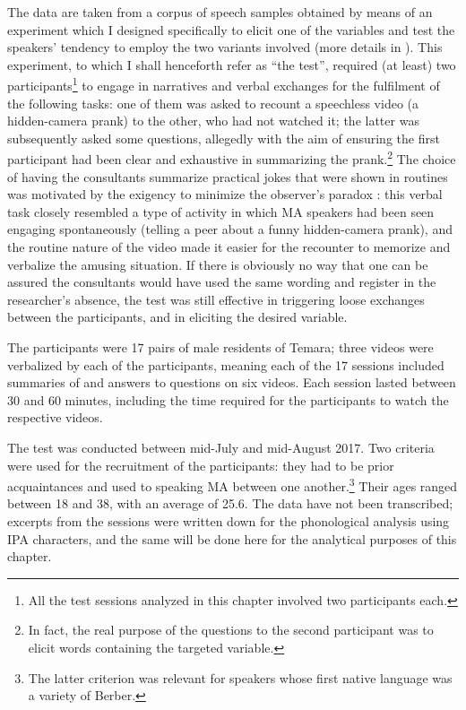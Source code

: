 \documentclass[output=paper]{langscibook}
\begin{document}
The data are taken from a corpus of speech samples obtained by means of an experiment which I designed specifically to elicit one of the variables and test the speakers’ tendency to employ the two variants involved (more details in \citealt{falchetta_social_2019}). This experiment, to which I shall henceforth refer as ``the test'', required (at least) two participants\footnote{All the test sessions analyzed in this chapter involved two participants each.} to engage in narratives and verbal exchanges for the fulfilment of the following tasks: one of them was asked to recount a speechless video (a hidden-camera prank) to the other, who had not watched it; the latter was subsequently asked some questions, allegedly with the aim of ensuring the first participant had been clear and exhaustive in summarizing the prank.\footnote{In fact, the real purpose of the questions to the second participant was to elicit words containing the targeted variable.} The choice of having the consultants summarize practical jokes that were shown in routines was motivated by the exigency to minimize the observer’s paradox \citep[208--209]{labov_sociolinguistic_1973}: this verbal task closely resembled a type of activity in which \gls*{MA} speakers had been seen engaging spontaneously (telling a peer about a funny hidden-camera prank), and the routine nature of the video made it easier for the recounter to memorize and verbalize the amusing situation. If there is obviously no way that one can be assured the consultants would have used the same wording and register in the researcher’s absence, the test was still effective in triggering loose exchanges between the participants, and in eliciting the desired variable.

The participants were 17 pairs of male residents of Temara; three videos were verbalized by each of the participants, meaning each of the 17 sessions included summaries of and answers to questions on six videos. Each session lasted between 30 and 60 minutes, including the time required for the participants to watch the respective videos. 

The test was conducted between mid-July and mid-August 2017. Two criteria were used for the recruitment of the participants: they had to be prior acquaintances and used to speaking \gls*{MA} between one another.\footnote{The latter criterion was relevant for speakers whose first native language was a variety of Berber.} Their ages ranged between 18 and 38, with an average of 25.6. The data have not been transcribed; excerpts from the sessions were written down for the phonological analysis using IPA characters, and the same will be done here for the analytical purposes of this chapter.
\end{document}
